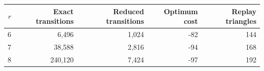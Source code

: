 \begin{tabular}{rrrrr}\toprule
$r$ & Exact transitions & Reduced transitions & Optimum cost & Replay triangles\\\midrule
6 & 6,496 & 1,024 & -82 & 144\\
7 & 38,588 & 2,816 & -94 & 168\\
8 & 240,120 & 7,424 & -97 & 192\\
\bottomrule\end{tabular}
